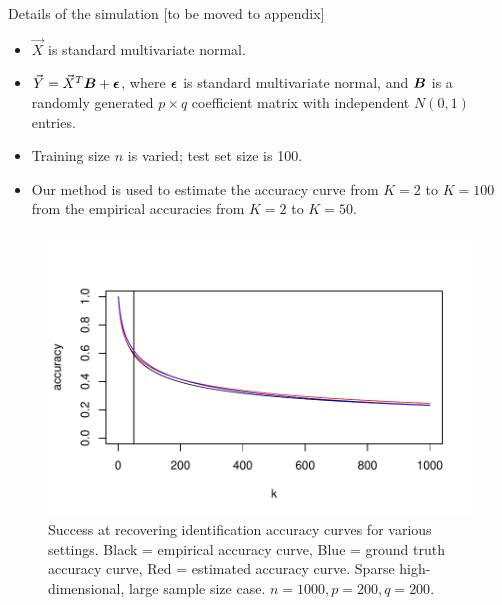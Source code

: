 \documentclass[12pt]{article}
\begin{document}
Details of the simulation [to be moved to appendix]
\begin{itemize}
\item $\vec{X}$ is standard multivariate normal.
\item $\vec{Y} = \vec{X}^T \boldsymbol{B} + \boldsymbol{\epsilon}$, where $\boldsymbol{\epsilon}$ is standard multivariate normal, and $\boldsymbol{B}$ is a randomly generated $p \times q$ coefficient matrix with independent $N(0, 1)$ entries.
\item Training size $n$ is varied; test set size is 100.
\item Our method is used to estimate the accuracy curve from $K=2$ to $K=100$ from the empirical accuracies from $K=2$ to $K=50$.
\end{itemize}

\begin{figure}
\begin{center}
\includegraphics[scale=0.7]{../info_theory_sims/fig_sim5d.pdf}
\end{center}
\label{fig:good_simulations}
\caption{Success at recovering identification accuracy curves for various settings.  Black = empirical accuracy curve, Blue = ground truth accuracy curve, Red = estimated accuracy curve. Sparse high-dimensional, large sample size case.  $n = 1000, p = 200, q = 200$.}
\end{figure}
\end{document}
